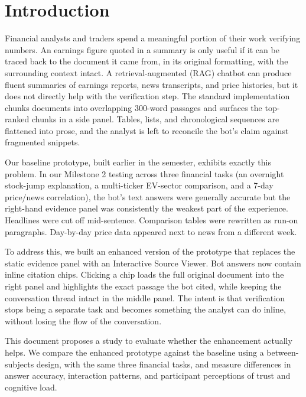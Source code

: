 \graphicspath{{Images/}}

\section{Introduction}

Financial analysts and traders spend a meaningful portion of their work verifying numbers. An earnings figure quoted in a summary is only useful if it can be traced back to the document it came from, in its original formatting, with the surrounding context intact. A retrieval-augmented (RAG) chatbot can produce fluent summaries of earnings reports, news transcripts, and price histories, but it does not directly help with the verification step. The standard implementation chunks documents into overlapping 300-word passages and surfaces the top-ranked chunks in a side panel. Tables, lists, and chronological sequences are flattened into prose, and the analyst is left to reconcile the bot's claim against fragmented snippets.

Our baseline prototype, built earlier in the semester, exhibits exactly this problem. In our Milestone 2 testing across three financial tasks (an overnight stock-jump explanation, a multi-ticker EV-sector comparison, and a 7-day price/news correlation), the bot's text answers were generally accurate but the right-hand evidence panel was consistently the weakest part of the experience. Headlines were cut off mid-sentence. Comparison tables were rewritten as run-on paragraphs. Day-by-day price data appeared next to news from a different week.

To address this, we built an enhanced version of the prototype that replaces the static evidence panel with an Interactive Source Viewer. Bot answers now contain inline citation chips. Clicking a chip loads the full original document into the right panel and highlights the exact passage the bot cited, while keeping the conversation thread intact in the middle panel. The intent is that verification stops being a separate task and becomes something the analyst can do inline, without losing the flow of the conversation.

This document proposes a study to evaluate whether the enhancement actually helps. We compare the enhanced prototype against the baseline using a between-subjects design, with the same three financial tasks, and measure differences in answer accuracy, interaction patterns, and participant perceptions of trust and cognitive load.
